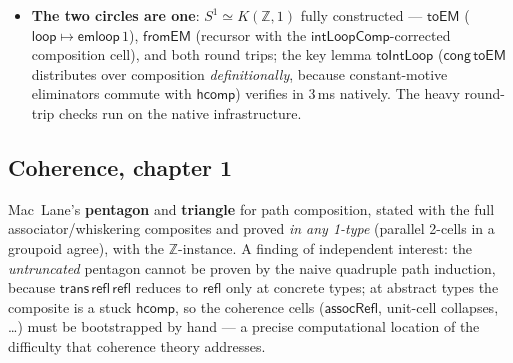 \documentclass[11pt]{article}
\newcommand{\Z}{\mathbb{Z}}
\newcommand{\op}[1]{\ensuremath{\mathsf{#1}}}
\begin{document}
\begin{itemize}[leftmargin=1.5em]
\emph{groupoid of sets} (with $\op{isGroupoidHSet}$ proved via the
carrier-path retraction and $\op{isSetPathU}$); $\op{uaCompMul}$
--- $\op{ua}$ of composed right-multiplications --- verified (108\,s in
the native runner); $\op{encode}$/$\op{decode}$/$\pi_1(K(G,1))\simeq G$
fully constructed, final checks running on the native infrastructure.
\item \textbf{The two circles are one}: $S^1\simeq K(\Z,1)$ fully
constructed --- $\op{toEM}$ ($\op{loop}\mapsto\op{emloop}\,1$),
$\op{fromEM}$ (recursor with the $\op{intLoopComp}$-corrected
composition cell), and both round trips; the key lemma
$\op{toIntLoop}$ ($\op{cong}\,\op{toEM}$ distributes over composition
\emph{definitionally}, because constant-motive eliminators commute with
$\op{hcomp}$) verifies in 3\,ms natively.  The heavy round-trip checks
run on the native infrastructure.
\end{itemize}

\subsection{Coherence, chapter 1}
Mac~Lane's \textbf{pentagon} and \textbf{triangle} for path composition,
stated with the full associator/whiskering composites and proved
\emph{in any 1-type} (parallel 2-cells in a groupoid agree), with the
$\Z$-instance.  A finding of independent interest: the \emph{untruncated}
pentagon cannot be proven by the naive quadruple path induction, because
$\op{trans}\,\op{refl}\,\op{refl}$ reduces to $\op{refl}$ only at
concrete types; at abstract types the composite is a stuck $\op{hcomp}$,
so the coherence cells ($\op{assocRefl}$, unit-cell collapses, \dots)
must be bootstrapped by hand --- a precise computational location of the
difficulty that coherence theory addresses.
\end{document}
